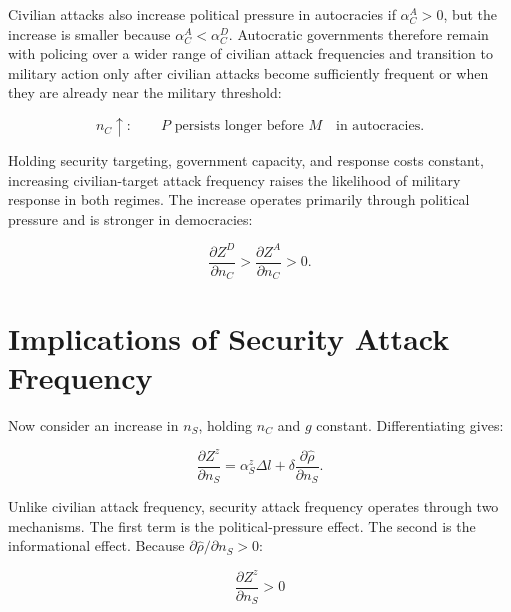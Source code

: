 \documentclass[
  letterpaper,
  DIV=11,
  numbers=noendperiod]{scrartcl}
\begin{document}
Civilian attacks also increase political pressure in autocracies if
\(\alpha_C^A>0\), but the increase is smaller because
\(\alpha_C^A<\alpha_C^D\). Autocratic governments therefore remain with
policing over a wider range of civilian attack frequencies and
transition to military action only after civilian attacks become
sufficiently frequent or when they are already near the military
threshold:

\[
\boxed{
n_C\uparrow:
\qquad
P\text{ persists longer before }M
\quad\text{in autocracies}.}
\]

\begin{tcolorbox}[enhanced jigsaw, arc=.35mm, bottomrule=.15mm, bottomtitle=1mm, breakable, colback=white, colbacktitle=quarto-callout-important-color!10!white, colframe=quarto-callout-important-color-frame, coltitle=black, left=2mm, leftrule=.75mm, opacityback=0, opacitybacktitle=0.6, rightrule=.15mm, title=\textcolor{quarto-callout-important-color}{\faExclamation}\hspace{0.5em}{Proposition 1: Civilian-target frequency}, titlerule=0mm, toprule=.15mm, toptitle=1mm]

Holding security targeting, government capacity, and response costs
constant, increasing civilian-target attack frequency raises the
likelihood of military response in both regimes. The increase operates
primarily through political pressure and is stronger in democracies:

\[
\frac{\partial Z^D}{\partial n_C}
>
\frac{\partial Z^A}{\partial n_C}>0.
\]

\end{tcolorbox}

\section{Implications of Security Attack
Frequency}\label{implications-of-security-attack-frequency}

Now consider an increase in \(n_S\), holding \(n_C\) and \(g\) constant.
Differentiating gives:

\[
\boxed{
\frac{\partial Z^z}{\partial n_S}
=
\alpha_S^z\Delta l
+\delta\frac{\partial\widehat{\rho}}{\partial n_S}.
}
\tag{25}
\]

Unlike civilian attack frequency, security attack frequency operates
through two mechanisms. The first term is the political-pressure effect.
The second is the informational effect. Because
\(\partial\widehat{\rho}/\partial n_S>0\):

\[
\boxed{
\frac{\partial Z^z}{\partial n_S}>0
}
\tag{26}
\]
\end{document}
